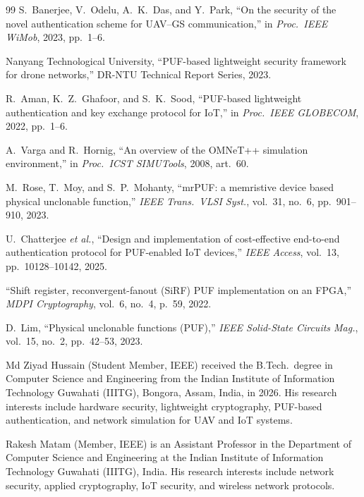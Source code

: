 \documentclass[journal,a4paper,10pt]{IEEEtran}
\begin{document}
\begin{thebibliography}{99}
 S.~Banerjee, V.~Odelu, A.~K.~Das,
and Y.~Park, ``On the security of the novel authentication scheme for
UAV--GS communication,'' in \emph{Proc.\ IEEE WiMob}, 2023,
pp.~1--6.

 Nanyang Technological University, ``PUF-based
lightweight security framework for drone networks,'' DR-NTU Technical
Report Series, 2023.

 R.~Aman, K.~Z.~Ghafoor, and S.~K.~Sood,
``PUF-based lightweight authentication and key exchange protocol for
IoT,'' in \emph{Proc.\ IEEE GLOBECOM}, 2022, pp.~1--6.

 A.~Varga and R.~Hornig, ``An overview of the
OMNeT++ simulation environment,'' in \emph{Proc.\ ICST SIMUTools},
2008, art.~60.

 M.~Rose, T.~Moy, and S.~P.~Mohanty, ``mrPUF: a
memristive device based physical unclonable function,'' \emph{IEEE
Trans.\ VLSI Syst.}, vol.~31, no.~6, pp.~901--910, 2023.

 U.~Chatterjee \textit{et al.},
``Design and implementation of cost-effective end-to-end
authentication protocol for PUF-enabled IoT devices,'' \emph{IEEE
Access}, vol.~13, pp.~10128--10142, 2025.

 ``Shift register, reconvergent-fanout (SiRF)
PUF implementation on an FPGA,'' \emph{MDPI Cryptography}, vol.~6,
no.~4, p.~59, 2022.

 D.~Lim, ``Physical unclonable functions
(PUF),'' \emph{IEEE Solid-State Circuits Mag.}, vol.~15, no.~2,
pp.~42--53, 2023.
\end{thebibliography}


\begin{IEEEbiographynophoto}{Md Ziyad Hussain}
(Student Member, IEEE) received the B.Tech.\ degree in Computer Science
and Engineering from the Indian Institute of Information Technology
Guwahati (IIITG), Bongora, Assam, India, in 2026. His research
interests include hardware security, lightweight cryptography,
PUF-based authentication, and network simulation for UAV and IoT
systems.
\end{IEEEbiographynophoto}

\begin{IEEEbiographynophoto}{Rakesh Matam}
(Member, IEEE) is an Assistant Professor in the Department of Computer
Science and Engineering at the Indian Institute of Information
Technology Guwahati (IIITG), India. His research interests include
network security, applied cryptography, IoT security, and wireless
network protocols.
\end{IEEEbiographynophoto}
\end{document}
